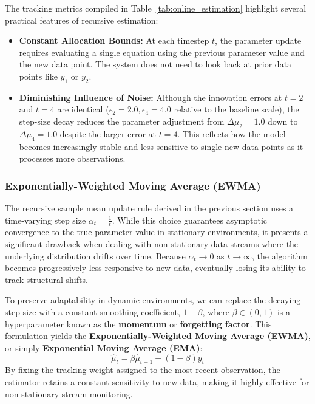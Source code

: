 \documentclass{article}
\begin{document}
The tracking metrics compiled in Table~\ref{tab:online_estimation} highlight several practical features of recursive estimation:
\begin{itemize}
    \item \textbf{Constant Allocation Bounds:} At each timestep $t$, the parameter update requires evaluating a single equation using the previous parameter value and the new data point. The system does not need to look back at prior data points like $y_1$ or $y_2$.
    \item \textbf{Diminishing Influence of Noise:} Although the innovation errors at $t=2$ and $t=4$ are identical ($\epsilon_2 = 2.0, \epsilon_4 = 4.0$ relative to the baseline scale), the step-size decay reduces the parameter adjustment from $\Delta \mu_2 = 1.0$ down to $\Delta \mu_4 = 1.0$ despite the larger error at $t=4$. This reflects how the model becomes increasingly stable and less sensitive to single new data points as it processes more observations.
\end{itemize}

\subsubsection{Exponentially-Weighted Moving Average (EWMA)}

The recursive sample mean update rule derived in the previous section uses a time-varying step size $\alpha_t = \frac{1}{t}$. While this choice guarantees asymptotic convergence to the true parameter value in stationary environments, it presents a significant drawback when dealing with non-stationary data streams where the underlying distribution drifts over time. Because $\alpha_t \to 0$ as $t \to \infty$, the algorithm becomes progressively less responsive to new data, eventually losing its ability to track structural shifts.

To preserve adaptability in dynamic environments, we can replace the decaying step size with a constant smoothing coefficient, $1 - \beta$, where $\beta \in (0, 1)$ is a hyperparameter known as the \textbf{momentum} or \textbf{forgetting factor}. This formulation yields the \textbf{Exponentially-Weighted Moving Average (EWMA)}, or simply \textbf{Exponential Moving Average (EMA)}:
\begin{equation}
\hat{\mu}_t = \beta \hat{\mu}_{t-1} + (1 - \beta) y_t
\end{equation}
By fixing the tracking weight assigned to the most recent observation, the estimator retains a constant sensitivity to new data, making it highly effective for non-stationary stream monitoring.
\end{document}
